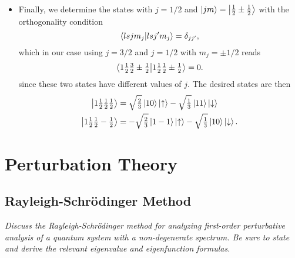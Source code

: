 \documentclass[11pt, a4paper]{article}
\newcommand{\Schro}{Schr\"{o}dinger\xspace}
\newcommand{\ua}{\uparrow}  %
\newcommand{\da}{\downarrow}  %
\begin{document}
\begin{itemize}
    \item Finally, we determine the states with $ j = 1/2 $ and $ \ket{jm} = \ket{\tfrac{1}{2} \pm \tfrac{1}{2}} $ with the orthogonality condition
    \begin{equation*}
        \braket{lsjm_{j}}{lsj'm_{j}} = \delta_{jj'},
    \end{equation*}
    which in our case using $ j = 3/2 $ and $ j = 1/2 $ with $ m_{j} = \pm 1/2 $ reads
    \begin{equation*}
        \braket{1 \tfrac{1}{2}\tfrac{3}{2}\pm \tfrac{1}{2}}{1 \tfrac{1}{2}\tfrac{1}{2}\pm \tfrac{1}{2}} = 0.
    \end{equation*}
    since these two states have different values of $ j $. The desired states are then
    \begin{align*}
        \ket{1 \tfrac{1}{2}\tfrac{1}{2}\tfrac{1}{2}} &= \sqrt{\tfrac{2}{3}}\ket{10} \ket{\ua} - \sqrt{\tfrac{1}{3}} \ket{11}\ket{\da}\\
        \ket{1 \tfrac{1}{2}\tfrac{1}{2}-\tfrac{1}{2}} &= -\sqrt{\tfrac{2}{3}}\ket{1-1} \ket{\ua} - \sqrt{\tfrac{1}{3}} \ket{10}\ket{\da}.
    \end{align*}
\end{itemize}


    
    
\newpage
\section{Perturbation Theory}

\subsection{Rayleigh-\Schro Method}
\textit{Discuss the Rayleigh-\Schro method for analyzing first-order perturbative analysis of a quantum system with a non-degenerate spectrum. Be sure to state and derive the relevant eigenvalue and eigenfunction formulas.}
\end{document}
